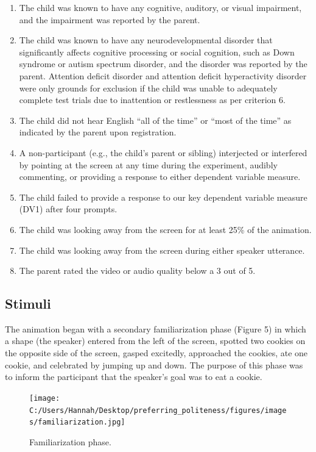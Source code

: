 \documentclass[
  english,
  man,floatsintext]{apa6}
\begin{document}
\begin{enumerate}
\def\labelenumi{\arabic{enumi}.}
\item
  The child was known to have any cognitive, auditory, or visual impairment, and the impairment was reported by the parent.
\item
  The child was known to have any neurodevelopmental disorder that significantly affects cognitive processing or social cognition, such as Down syndrome or autism spectrum disorder, and the disorder was reported by the parent. Attention deficit disorder and attention deficit hyperactivity disorder were only grounds for exclusion if the child was unable to adequately complete test trials due to inattention or restlessness as per criterion 6.
\item
  The child did not hear English ``all of the time'' or ``most of the time'' as indicated by the parent upon registration.
\item
  A non-participant (e.g., the child's parent or sibling) interjected or interfered by pointing at the screen at any time during the experiment, audibly commenting, or providing a response to either dependent variable measure.
\item
  The child failed to provide a response to our key dependent variable measure (DV1) after four prompts.
\item
  The child was looking away from the screen for at least 25\% of the animation.
\item
  The child was looking away from the screen during either speaker utterance.
\item
  The parent rated the video or audio quality below a 3 out of 5.
\end{enumerate}

\hypertarget{stimuli}{%
\subsection{Stimuli}\label{stimuli}}

The animation began with a secondary familiarization phase (Figure 5) in which a shape (the speaker) entered from the left of the screen, spotted two cookies on the opposite side of the screen, gasped excitedly, approached the cookies, ate one cookie, and celebrated by jumping up and down. The purpose of this phase was to inform the participant that the speaker's goal was to eat a cookie.

\begin{figure}
\centering
\texttt{[image: C:/Users/Hannah/Desktop/preferring\_politeness/figures/images/familiarization.jpg]}
\caption{Familiarization phase.}
\end{figure}
\end{document}
